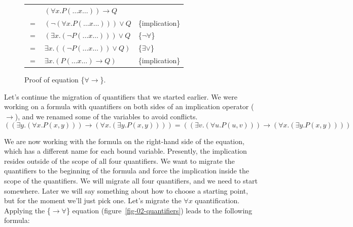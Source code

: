 {{\begin{figure}
\begin{center}
\begin{tabular}{cll}
   & $(\forall x.P(\dots x \dots)) \rightarrow Q$ & \\
$=$&  $(\neg(\forall x.P(\dots x \dots))) \vee Q$ & \{implication\}\\
$=$& $(\exists x.(\neg P(\dots x \dots))) \vee Q$ & \{$\neg\forall$\}\\
$=$&  $\exists x.((\neg P(\dots x \dots)) \vee Q)$& \{$\exists\vee$\}\\
$=$&  $\exists x.(P(\dots x \dots) \rightarrow Q)$& \{implication\}\\
\end{tabular}
\end{center}
\caption{Proof of equation \{${\forall}{\rightarrow}$\}.}
\label{fig:quantifier-negation}
\end{figure}


Let's continue the migration of quantifiers that
we started earlier.
We were working on a formula with quantifiers on both sides
of an implication operator ($\rightarrow$), and
we renamed some of the variables to avoid conflicts.
$$((\exists y.(\forall x.P(x, y))) \rightarrow (\forall x.(\exists y.P(x, y)))) =
((\exists v.(\forall u.P(u, v))) \rightarrow (\forall x.(\exists y.P(x, y))))$$

We are now working with the formula on the right-hand side of the equation,
which has a different name for each bound variable.
Presently, the implication resides
outside of the scope of all four quantifiers.
We want to migrate the quantifiers to the beginning of the formula
and force the implication inside the scope of the quantifiers.
We will migrate all four quantifiers, and we need to start somewhere.
Later we will say something about how to choose a starting point,
but for the moment we'll just pick one.
Let's migrate the $\forall x$ quantification.
Applying the \{${\rightarrow}{\forall}$\} equation (figure~\ref{fig-02-quantifiers})
leads to the following formula:

}}
